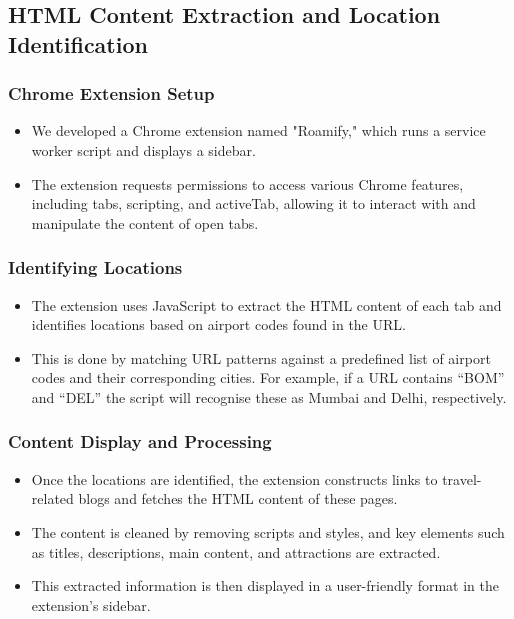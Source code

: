 \documentclass[conference]{IEEEtran}
\begin{document}
    \subsection{HTML Content Extraction and Location Identification}

        \subsubsection{Chrome Extension Setup}
            \begin{itemize}
                \item We developed a Chrome extension named "Roamify," which runs a service worker script and displays a sidebar.
                \item The extension requests permissions to access various Chrome features, including tabs, scripting, and activeTab, allowing it to interact with and manipulate the content of open tabs.
            \end{itemize}

        \subsubsection{Identifying Locations}
            \begin{itemize}
                \item The extension uses JavaScript to extract the HTML content of each tab and identifies locations based on airport codes found in the URL.
                \item This is done by matching URL patterns against a predefined list of airport codes and their corresponding cities. For example, if a URL contains “BOM” and “DEL” the script will recognise these as Mumbai and Delhi, respectively.
            \end{itemize}

        \subsubsection{Content Display and Processing}
            \begin{itemize}
                \item Once the locations are identified, the extension constructs links to travel-related blogs and fetches the HTML content of these pages.
                \item The content is cleaned by removing scripts and styles, and key elements such as titles, descriptions, main content, and attractions are extracted.
                \item This extracted information is then displayed in a user-friendly format in the extension’s sidebar.
            \end{itemize}
\end{document}
